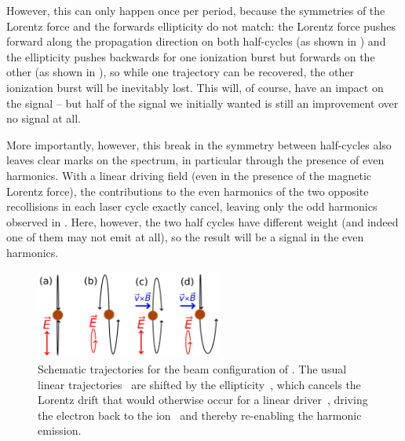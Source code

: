 However, this can only happen once per period, because the symmetries of the Lorentz force and the forwards ellipticity do not match: the Lorentz force pushes forward along the propagation direction on both half-cycles (as shown in ) and the ellipticity pushes backwards for one ionization burst but forwards on the other (as shown in ), so while one trajectory can be recovered, the other ionization burst will be inevitably lost. This will, of course, have an impact on the signal -- but half of the signal we initially wanted is still an improvement over no signal at all.




More importantly, however, this break in the symmetry between half-cycles also leaves clear marks on the spectrum, in particular through the presence of even harmonics. With a linear driving field (even in the presence of the magnetic Lorentz force), the contributions to the even harmonics of the two opposite recollisions in each laser cycle exactly cancel, leaving only the odd harmonics observed in . Here, however, the two half cycles have different weight (and indeed one of them may not emit at all), so the result will be a signal in the even harmonics. 


\begin{figure}[t!]
  \centering
  \subfloat{\label{f8-schematic-trajectories-a}}
  \subfloat{\label{f8-schematic-trajectories-b}}
  \subfloat{\label{f8-schematic-trajectories-c}}
  \subfloat{\label{f8-schematic-trajectories-d}}
  \includegraphics[width=0.55\textwidth]{9-Nondipole-HHG/Figures/figure9C.png} 
  \caption[
  Schematic electron trajectories in a forwards-elliptical field, with the effect of the ellipticity, the Lorentz force, and their combination
  ]{
  Schematic trajectories for the beam configuration of . The usual linear trajectories~\protect{} are shifted by the ellipticity~\protect{}, which cancels the Lorentz drift that would otherwise occur for a linear driver~\protect{}, driving the electron back to the ion~\protect{} and thereby re-enabling the harmonic emission.
  }
\label{f8-schematic-trajectories}
\end{figure}




